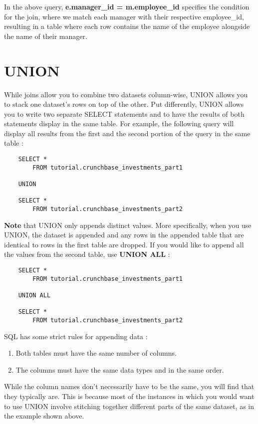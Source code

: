 \documentclass[12pt, letterpaper]{article}
\begin{document}
In the above query, \textbf{e.manager\_id = m.employee\_id} specifies the condition for the join, where we match each manager with their respective employee\_id, resulting in a table where each row contains the name of the employee alongside the name of their manager.


\section{UNION}
While joins allow you to combine two datasets column-wise, UNION allows you to stack one dataset's rows on top of the other. Put differently, UNION allows you to write two separate SELECT statements and to have the results of both statements display in the same table. For example, the following query will display all results from the first and the second portion of the query in the same table : 

\begin{verbatim}
    SELECT *
        FROM tutorial.crunchbase_investments_part1

    UNION

    SELECT *
        FROM tutorial.crunchbase_investments_part2
\end{verbatim}

\textbf{Note} that UNION only appends distinct values. More specifically, when you use UNION, the dataset is appended and any rows in the appended table that are identical to rows in the first table are dropped. If you would like to append all the values from the second table, use \textbf{UNION ALL} : 

\begin{verbatim}
    SELECT *
        FROM tutorial.crunchbase_investments_part1

    UNION ALL

    SELECT *
        FROM tutorial.crunchbase_investments_part2
\end{verbatim}

SQL has some strict rules for appending data : 

\begin{enumerate}
    \item Both tables must have the same number of columns.
    \item The columns must have the same data types and in the same order.
\end{enumerate}

While the column names don't necessarily have to be the same, you will find that they typically are. This is because most of the instances in which you would want to use UNION involve stitching together different parts of the same dataset, as in the example shown above.
\end{document}
